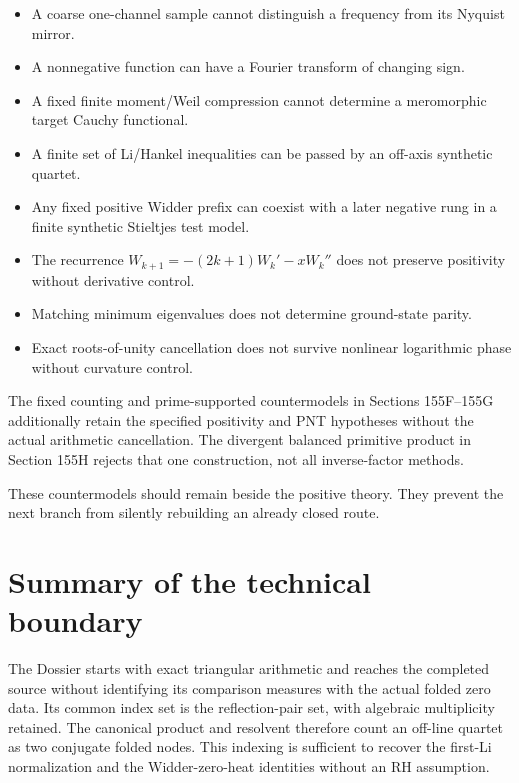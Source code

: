 \documentclass[
  11pt,
]{book}
\providecommand{\tightlist}{%
  \setlength{\itemsep}{0pt}\setlength{\parskip}{0pt}}
\begin{document}
\begin{itemize}
\tightlist
\item
  A coarse one-channel sample cannot distinguish a frequency from its
  Nyquist mirror.
\item
  A nonnegative function can have a Fourier transform of changing sign.
\item
  A fixed finite moment/Weil compression cannot determine a meromorphic
  target Cauchy functional.
\item
  A finite set of Li/Hankel inequalities can be passed by an off-axis
  synthetic quartet.
\item
  Any fixed positive Widder prefix can coexist with a later negative
  rung in a finite synthetic Stieltjes test model.
\item
  The recurrence \(W_{k+1}=-(2k+1)W_k'-xW_k''\) does not preserve
  positivity without derivative control.
\item
  Matching minimum eigenvalues does not determine ground-state parity.
\item
  Exact roots-of-unity cancellation does not survive nonlinear
  logarithmic phase without curvature control.
\end{itemize}

The fixed counting and prime-supported countermodels in Sections
155F--155G additionally retain the specified positivity and PNT
hypotheses without the actual arithmetic cancellation. The divergent
balanced primitive product in Section 155H rejects that one
construction, not all inverse-factor methods.

These countermodels should remain beside the positive theory. They
prevent the next branch from silently rebuilding an already closed
route.

\newpage

\chapter{Summary of the technical
boundary}\label{summary-of-the-technical-boundary}

The Dossier starts with exact triangular arithmetic and reaches the
completed source without identifying its comparison measures with the
actual folded zero data. Its common index set is the reflection-pair
set, with algebraic multiplicity retained. The canonical product and
resolvent therefore count an off-line quartet as two conjugate folded
nodes. This indexing is sufficient to recover the first-Li normalization
and the Widder-zero-heat identities without an RH assumption.
\end{document}
